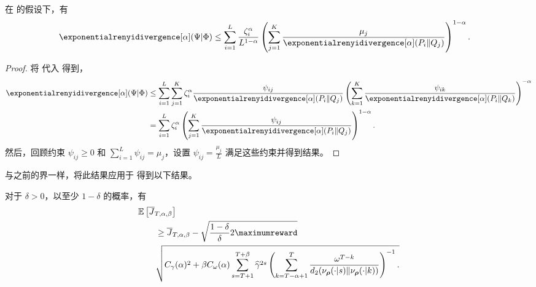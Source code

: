 \begin{prop}
在  的假设下，有
    \begin{align*}
        \exponentialrenyidivergence[\alpha](\Psi\vert\Phi)
        &\leq \sum_{i=1}^L \frac{\zeta_i^\alpha}{L^{1-\alpha}}
        \left(
            \sum_{j=1}^K \frac{\mu_j}{\exponentialrenyidivergence[\alpha](P_i \Vert Q_j)}
        \right)^{1-\alpha}.
    \end{align*}
\end{prop}
\begin{proof}
    将  代入  得到，
    \begin{align*}
        \exponentialrenyidivergence[\alpha](\Psi\vert\Phi)
        &\leq \sum_{i=1}^L\sum_{j=1}^K \zeta_i^\alpha \frac{\psi_{ij}}{\exponentialrenyidivergence[\alpha](P_i \Vert Q_j)}
        \left(
            \sum_{k=1}^K \frac{\psi_{ik}}{\exponentialrenyidivergence[\alpha](P_i \Vert Q_k)}
        \right)^{-\alpha}
        \\
        &= \sum_{i=1}^L \zeta_i^\alpha
        \left(
            \sum_{j=1}^K \frac{\psi_{ij}}{\exponentialrenyidivergence[\alpha](P_i \Vert Q_j)}
        \right)^{1-\alpha}.
    \end{align*}
    然后，回顾约束 $\psi_{ij}\geq 0$ 和 $\textstyle\sum_{i=1}^L \psi_{ij}=\mu_j$，设置 $\psi_{ij}=\frac{\mu_j}{L}$ 满足这些约束并得到结果。
\end{proof}

与之前的界一样，将此结果应用于  得到以下结果。

\begin{prop}
    对于 $\delta>0$，以至少 $1-\delta$ 的概率，有
    \begin{align*}
        &\mathbb{E}\left[\overline{J}_{T,\alpha,\beta} \right]
        \\
        &\qquad \geq  \overline{J}_{T,\alpha,\beta} -
        \sqrt{
            \frac{1-\delta}{\delta} 2  \maximumreward  }
        \\
        &\qquad
        \sqrt{
            C_\gamma(\alpha)^2 +
            \beta C_\omega(\alpha)
            \sum_{s=T+1}^{T+\beta} \widehat{\gamma}^{2s}
            \left(
                \sum_{k=T-\alpha+1}^T\frac{\omega^{T-k}}{ d_2(\nu_{\boldsymbol\rho}(\cdot\vert s)\Vert \nu_{\boldsymbol\rho}(\cdot\vert k))}
            \right)^{-1}.
        }
    \end{align*}
\end{prop}


